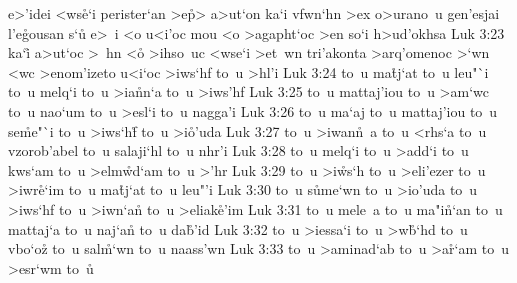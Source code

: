 e>'idei
<ws\r{e}`i
perister`an
>e\r{p}>
a>ut`on
ka`i
vfwn`hn
>ex
o>urano~u
gen'esjai
l'e\r{g}ousan
s`u\r{}
e>~i
<o
u<i'oc
mou
<o
>agapht`oc
>en
so`i
h>ud'okhsa\bibvsend
\vs Luk 3:23
ka`i\r{}
a>ut`oc
>~hn
<o\r{}
>ihso~uc
<wse`i
>et~wn
tri'akonta
>arq'omenoc
>`wn
<wc
>enom'izeto
u<i`oc
>iws`hf
to~u
>hl'i\bibvsend
\vs Luk 3:24
to~u
ma\r{t}j`at
to~u
leu"`i
to~u
melq`i
to~u
>ia\r{n}n`a
to~u
>iws'hf\bibvsend
\vs Luk 3:25
to~u
mattaj'iou
to~u
>am`wc
to~u
nao`um
to~u
>esl`i
to~u
nagga'i\bibvsend
\vs Luk 3:26
to~u
ma`aj
to~u
mattaj'iou
to~u
se\r{m}e"`i
to~u
>iws`h\r{f}
to~u
>i\r{o}'uda\bibvsend
{}
\vs Luk 3:27
to~u
>iwan\r{n}~a
to~u
<rhs`a
to~u
vzorob'abel
to~u
salaji`hl
to~u
nhr'i\bibvsend
\vs Luk 3:28
to~u
melq`i
to~u
>add`i
to~u
kws`am
to~u
>elm\r{w}d`am
to~u
>'hr\bibvsend
\vs Luk 3:29
to~u
>i\r{w}s`h
to~u
>eli'ezer
to~u
>iwr\r{e}`im
to~u
ma\r{t}j`at
to~u
leu"'i\bibvsend
\vs Luk 3:30
to~u
s\r{u}me`wn
to~u
>io'uda
to~u
>iws`hf
to~u
>iwn`a\r{n}
to~u
>eliak\r{e}'im\bibvsend
{}
\vs Luk 3:31
to~u
mele~a
to~u
ma"i\r{n}`an
to~u
mattaj`a
to~u
naj`a\r{n}
to~u
da\r{b}'id\bibvsend
{}
\vs Luk 3:32
to~u
>iessa`i
to~u
>w\r{b}`hd
to~u
vbo`o\r{z}
to~u
sal\r{m}`wn
to~u
naass'wn\bibvsend
\vs Luk 3:33
to~u
>aminad`ab
to~u
>a\r{r}`am
to~u
>esr`wm
to~u\r{}
